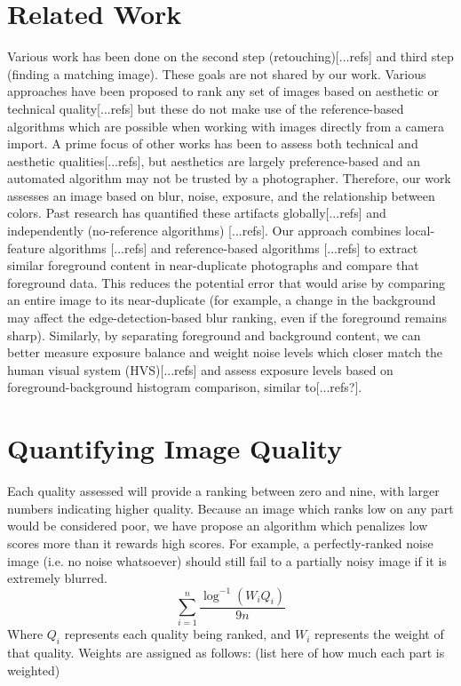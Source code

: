 \documentclass[twocolumn]{article}
\begin{document}
\section{Related Work}
Various work has been done on the second step (retouching)[...refs] and third step (finding a matching image)\cite{Yeh:2010:PPR:1873951.1873963}. These goals are not shared by our work.
Various approaches have been proposed to rank any set of images based on aesthetic or technical quality[...refs] but these do not make use of the reference-based algorithms which are possible when working with images directly from a camera import. A prime focus of other works has been to assess both technical and aesthetic qualities[...refs], but aesthetics are largely preference-based and an automated algorithm may not be trusted by a photographer.
Therefore, our work assesses an image based on blur, noise, exposure, and the relationship between colors. Past research has quantified these artifacts globally[...refs] and independently (no-reference algorithms) [...refs]. Our approach combines local-feature algorithms [...refs] and reference-based algorithms [...refs] to extract similar foreground content in near-duplicate photographs and compare that foreground data. This reduces the potential error that would arise by comparing an entire image to its near-duplicate (for example, a change in the background may affect the edge-detection-based blur ranking, even if the foreground remains sharp).
Similarly, by separating foreground and background content, we can better measure exposure balance and weight noise levels which closer match the human visual system (HVS)[...refs] and assess exposure levels based on foreground-background histogram comparison, similar to[...refs?].
\section{Quantifying Image Quality}
Each quality assessed will provide a ranking between zero and nine, with larger numbers indicating higher quality. Because an image which ranks low on any part would be considered poor, we have propose an algorithm which penalizes low scores more than it rewards high scores. For example, a perfectly-ranked noise image (i.e. no noise whatsoever) should still fail to a partially noisy image if it is extremely blurred.
\[
\displaystyle\sum\limits_{i=1}^n\frac{\log^{-1}(W_iQ_i)}{9n}
\]
Where \(Q_i\) represents each quality being ranked, and \(W_i\) represents the weight of that quality. Weights are assigned as follows: (list here of how much each part is weighted)
\end{document}
